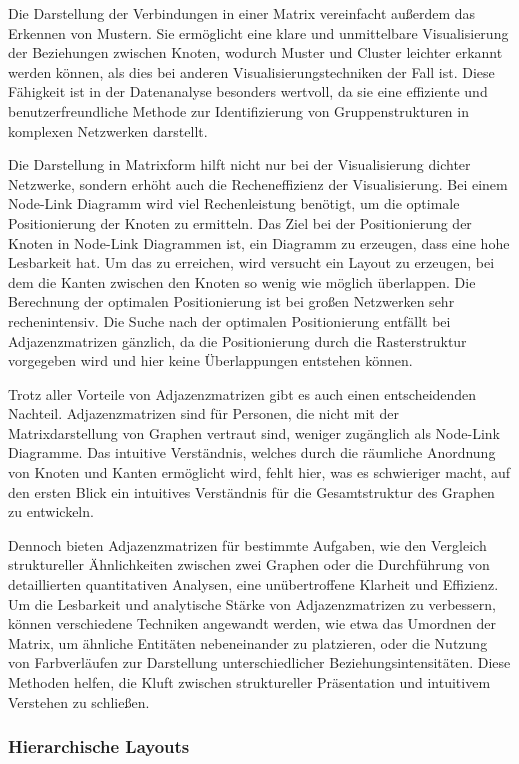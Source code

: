 Die Darstellung der Verbindungen in einer Matrix vereinfacht außerdem das Erkennen von Mustern. Sie ermöglicht eine klare und unmittelbare Visualisierung der Beziehungen zwischen Knoten, wodurch Muster und Cluster leichter erkannt werden können, als dies bei anderen Visualisierungstechniken der Fall ist. Diese Fähigkeit ist in der Datenanalyse besonders wertvoll, da sie eine effiziente und benutzerfreundliche Methode zur Identifizierung von Gruppenstrukturen in komplexen Netzwerken darstellt.

Die Darstellung in Matrixform hilft nicht nur bei der Visualisierung dichter Netzwerke, sondern erhöht auch die Recheneffizienz der Visualisierung. Bei einem Node-Link Diagramm wird viel Rechenleistung benötigt, um die optimale Positionierung der Knoten zu ermitteln. Das Ziel bei der Positionierung der Knoten in Node-Link Diagrammen ist, ein Diagramm zu erzeugen, dass eine hohe Lesbarkeit hat. Um das zu erreichen, wird versucht ein Layout zu erzeugen, bei dem die Kanten zwischen den Knoten so wenig wie möglich überlappen. Die Berechnung der optimalen Positionierung ist bei großen Netzwerken sehr rechenintensiv. Die Suche nach der optimalen Positionierung entfällt bei Adjazenzmatrizen gänzlich, da die Positionierung durch die Rasterstruktur vorgegeben wird und hier keine Überlappungen entstehen können.

Trotz aller Vorteile von Adjazenzmatrizen gibt es auch einen entscheidenden Nachteil. Adjazenzmatrizen sind für Personen, die nicht mit der Matrixdarstellung von Graphen vertraut sind, weniger zugänglich als Node-Link Diagramme. Das intuitive Verständnis, welches durch die räumliche Anordnung von Knoten und Kanten ermöglicht wird, fehlt hier, was es schwieriger macht, auf den ersten Blick ein intuitives Verständnis für die Gesamtstruktur des Graphen zu entwickeln.

Dennoch bieten Adjazenzmatrizen für bestimmte Aufgaben, wie den Vergleich struktureller Ähnlichkeiten zwischen zwei Graphen oder die Durchführung von detaillierten quantitativen Analysen, eine unübertroffene Klarheit und Effizienz. Um die Lesbarkeit und analytische Stärke von Adjazenzmatrizen zu verbessern, können verschiedene Techniken angewandt werden, wie etwa das Umordnen der Matrix, um ähnliche Entitäten nebeneinander zu platzieren, oder die Nutzung von Farbverläufen zur Darstellung unterschiedlicher Beziehungsintensitäten. Diese Methoden helfen, die Kluft zwischen struktureller Präsentation und intuitivem Verstehen zu schließen.

\subsubsection{Hierarchische Layouts}

